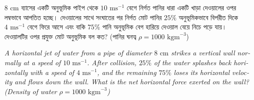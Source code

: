 \documentclass[12pt, a4paper]{article}
\begin{document}
\begin{tcolorbox}[questionbox={প্রশ্ন (Question) 4}]
    \noindent
    $8\text{ cm}$ ব্যাসের একটি অনুভূমিক পাইপ থেকে $10\text{ ms}^{-1}$ বেগে নির্গত পানির ধারা একটি খাড়া দেওয়ালের ওপর লম্বভাবে আপতিত হচ্ছে। দেওয়ালের সাথে সংঘাতের পর নির্গত মোট পানির $25\%$ অনুভূমিকভাবে বিপরীত দিকে $4\text{ ms}^{-1}$ বেগে ফিরে আসে এবং বাকি $75\%$ পানি অনুভূমিক বেগ হারিয়ে দেওয়াল বেয়ে নিচে পড়ে যায়। দেওয়ালটির ওপর প্রযুক্ত মোট অনুভূমিক বল কত? (পানির ঘনত্ব $\rho = 1000\text{ kgm}^{-3}$)
    
    \vspace{0.8em}
    \begin{english}
    \noindent\textit{\color{darkgray}
    A horizontal jet of water from a pipe of diameter $8\text{ cm}$ strikes a vertical wall normally at a speed of $10\text{ ms}^{-1}$. After collision, $25\%$ of the water splashes back horizontally with a speed of $4\text{ ms}^{-1}$, and the remaining $75\%$ loses its horizontal velocity and flows down the wall. What is the net horizontal force exerted on the wall? (Density of water $\rho = 1000\text{ kgm}^{-3}$)
    }
    \end{english}
\end{tcolorbox}
\end{document}
